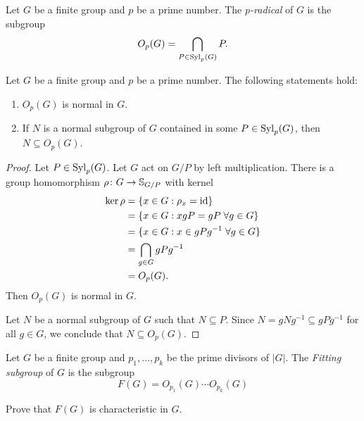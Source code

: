 \begin{definition}
Let $G$ be a finite group and $p$ be a prime number. 
The \emph{$p$-radical} of $G$ is the subgroup 
\[
O_p(G)=\bigcap_{P\in\mathrm{Syl}_p(G)}P.
\]
\end{definition}

\begin{lemma}
\label{lem:core:Op(G)}
Let $G$ be a finite group and $p$ be a prime number. The following statements hold: 
\begin{enumerate}
    \item $O_p(G)$ is normal in $G$.
    \item If $N$ is a normal subgroup of $G$ contained in some 
    $P\in\mathrm{Syl}_p(G)$, then $N\subseteq O_p(G)$.
\end{enumerate}
\end{lemma}

\begin{proof}
Let $P\in\mathrm{Syl}_p(G)$. Let $G$ act on $G/P$ by left multiplication. There is a group homomorphism 
$\rho\colon G\to\mathbb{S}_{G/P}$ with kernel 
\begin{align*}
		\ker\rho&=\{x\in G:\rho_x=\operatorname{id}\}\\
		&=\{x\in G:xgP=gP\;\forall g\in G\}\\
		&=\{x\in G:x\in gPg^{-1}\;\forall g\in G\}\\
    &=\bigcap_{g\in G}gPg^{-1}\\
    &=O_p(G).
\end{align*}
Then $O_p(G)$ is normal in $G$.

Let $N$ be a normal subgroup of $G$ such that $N\subseteq P$. Since 
$N=gNg^{-1}\subseteq gPg^{-1}$ for all $g\in G$, we conclude that 
$N\subseteq O_p(G)$.
\end{proof}

\begin{definition}
Let $G$ be a finite group and $p_1,\dots,p_k$ be the prime divisors of 
$|G|$. The \emph{Fitting subgroup} of $G$ is the subgroup 
\[
F(G)=O_{p_1}(G)\cdots O_{p_k}(G)
\]
\end{definition}

\begin{exercise}
\label{xca:Fitting_char}
Prove that $F(G)$ is characteristic in $G$.
\end{exercise}


